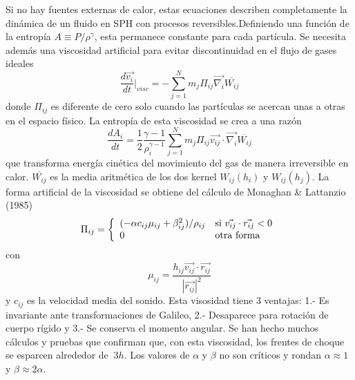 \documentclass[a4paper,openright,12pt]{book}
\begin{document}
Si no hay fuentes externas de calor, estas ecuaciones describen completamente la dinámica de un fluido en SPH con procesos reversibles.Definiendo una función de la entropía $A\equiv P / \rho^{\gamma}$, esta permanece constante para cada partícula. Se necesita además una viscosidad artificial para evitar discontinuidad en el flujo de gases ideales 
\begin{equation}
  \frac{d \vec{v_{i}}}{d t}|_{visc} 
  =
  -\sum_{j=1}^{N} m_{j} \Pi_{ij} \vec{\nabla_{i}}\overline{W_{ij}}\label{eqn2.32}
\end{equation}
donde $\Pi_{ij}$ es diferente de cero solo cuando las partículas se acercan unas a otras en el espacio físico. La entropía de esta viscosidad se crea a una razón
\begin{equation}
 \frac{d A_{i}}{d t} 
 =
 \frac{1}{2}
 \frac{\gamma - 1}{\rho_{i}^{\gamma -1}}
 \sum_{j=1}^{N} m_{j} \Pi_{ij} \vec{v_{ij}}\cdot \vec{\nabla_{i}}\overline{W_{ij}}\label{eqn2.33}
\end{equation}
que transforma energía cinética del movimiento del gas de manera irreversible en calor. $\overline{W_{ij}}$ es la media aritmética de los dos kernel $W_{ij}(h_{i})$ y $W_{ij}(h_{j})$. La forma artificial de la viscosidad se obtiene del cálculo de Monaghan \& Lattanzio (1985) \cite{b8.1}
\begin{equation}
\Pi_{ij} = \left\lbrace
\begin{array}{ll}
(-\alpha c_{ij} \mu_{ij} + \beta_{ij}^{2})/ \rho_{ij} & \textup{si } \vec{v_{ij}}\cdot \vec{r_{ij}}<0 \\
0 & \textup{otra forma }\label{eqn2.34}
\end{array}
\right.
\end{equation}
con
\begin{equation}
 \mu_{ij}
 =
 \frac{h_{ij} \vec{v_{ij}} \cdot \vec{r_{ij}}}{|\vec{r_{ij}}|^{2}}\label{eqn2.35}
\end{equation}
y $c_{ij}$ es la velocidad media del sonido. Esta visosidad tiene 3 ventajas: 1.- Es invariante ante transformaciones de Galileo, 2.- Desaparece para rotación de cuerpo rígido y 3.- Se conserva el momento angular. Se han hecho muchos cálculos y pruebas que confirman que, con esta viscosidad, los frentes de choque se esparcen alrededor de $~ 3h$. Los valores de $\alpha$ y $\beta$ no son críticos y rondan $\alpha\approx 1$ y $\beta \approx 2\alpha$.
\end{document}
